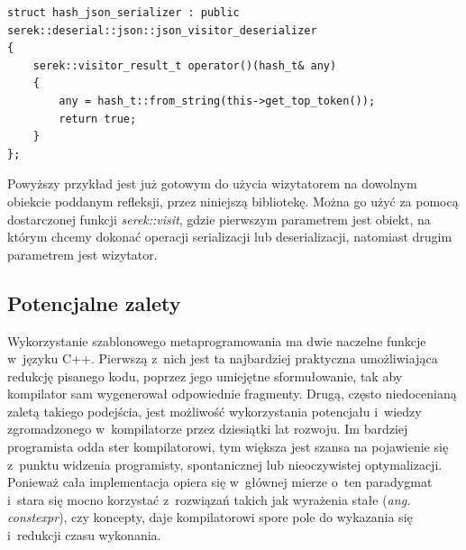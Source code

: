 \documentclass[12pt]{article}
\newcommand{\nonpl}[1]{{\it #1}}
\newcommand{\code}[1]{{\it #1}}
\newcommand{\ang}[1]{\nonpl{ang. #1}}
\begin{document}
{{{				\begin{lstlisting}[frame=single]
struct hash_json_serializer : public serek::deserial::json::json_visitor_deserializer
{
	serek::visitor_result_t operator()(hash_t& any)
	{
		any = hash_t::from_string(this->get_top_token());
		return true;
	}
};
				\end{lstlisting}

				Powyższy przykład jest już gotowym do użycia wizytatorem na dowolnym obiekcie poddanym refleksji, przez niniejszą
				bibliotekę. Można go użyć za pomocą dostarczonej funkcji \code{serek::visit}, gdzie pierwszym parametrem jest obiekt, na którym
				chcemy dokonać operacji serializacji lub deserializacji, natomiast drugim parametrem jest wizytator.
			}
		}

		{
			\subsection{Potencjalne zalety}

			Wykorzystanie szablonowego metaprogramowania\cite{wiki_meta} ma dwie naczelne funkcje w~języku C++. Pierwszą z~nich jest
			ta najbardziej praktyczna umożliwiająca redukcję pisanego kodu, poprzez jego umiejętne sformułowanie, tak aby kompilator
			sam wygenerował odpowiednie fragmenty. Drugą, często niedocenianą zaletą takiego podejścia, jest możliwość wykorzystania
			potencjału i~wiedzy zgromadzonego w~kompilatorze przez dziesiątki lat rozwoju. Im bardziej programista odda ster
			kompilatorowi, tym większa jest szansa na pojawienie się z~punktu widzenia programisty, spontanicznej lub nieoczywistej
			optymalizacji. Ponieważ cała implementacja opiera się w~głównej mierze o~ten paradygmat i~stara się mocno korzystać
			z~rozwiązań takich jak wyrażenia stałe (\ang{constexpr}), czy koncepty, daje kompilatorowi spore pole do wykazania się
			i~redukcji czasu wykonania.
		}
	}
\end{document}
